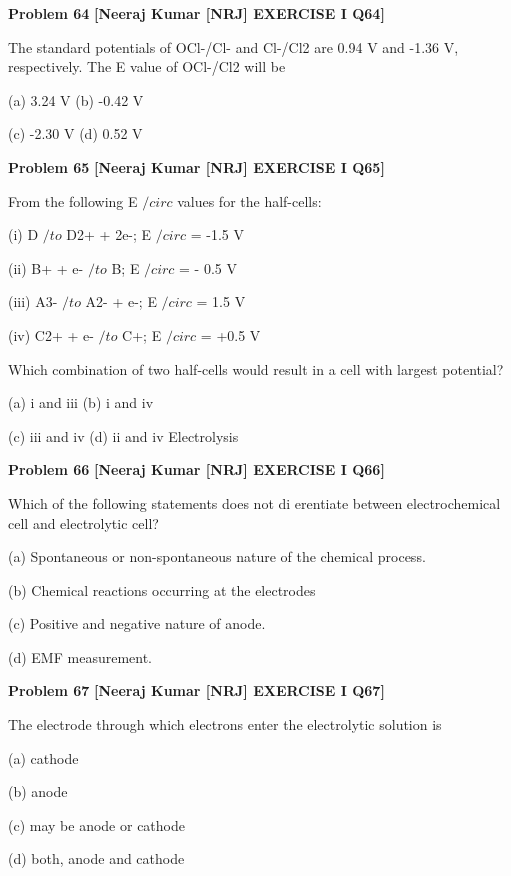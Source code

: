 \begin{problembox}
\textbf{Problem 64} \hfill \textbf{[Neeraj Kumar [NRJ] EXERCISE I Q64]}
\label{q:ext-nrj_all_questions-64}

The standard potentials of OCl-/Cl- and Cl-/Cl2 
are 0.94 V and -1.36 V, respectively. The E  value 
of OCl-/Cl2 will be
 
 (a) 3.24 V 
(b) -0.42 V
 
 (c) -2.30 V 
(d) 0.52 V
\end{problembox}

\begin{problembox}
\textbf{Problem 65} \hfill \textbf{[Neeraj Kumar [NRJ] EXERCISE I Q65]}
\label{q:ext-nrj_all_questions-65}

From the following E $/circ$ values for the half-cells:
 
   (i) D $/to$ D2+ + 2e-; E $/circ$ = -1.5 V
 
  (ii) B+ + e- $/to$ B; E $/circ$ = - 0.5 V
 
 (iii) A3- $/to$ A2- + e-; E $/circ$ = 1.5 V
 
 (iv) C2+ + e- $/to$ C+; E $/circ$ = +0.5 V
 
 Which combination of two half-cells would result 
in a cell with largest  potential?
 
 (a) i and iii 
(b) i and iv
 
 (c) iii and iv 
(d) ii and iv
Electrolysis
\end{problembox}

\begin{problembox}
\textbf{Problem 66} \hfill \textbf{[Neeraj Kumar [NRJ] EXERCISE I Q66]}
\label{q:ext-nrj_all_questions-66}

Which of the following statements does not 
di  erentiate between electrochemical cell and 
electrolytic cell?
 
 (a)  Spontaneous or non-spontaneous nature of 
the chemical process.
 
 (b)  Chemical reactions occurring at the electrodes
 
 (c) Positive and negative nature of anode.
 
 (d) EMF measurement.
\end{problembox}

\begin{problembox}
\textbf{Problem 67} \hfill \textbf{[Neeraj Kumar [NRJ] EXERCISE I Q67]}
\label{q:ext-nrj_all_questions-67}

The electrode through which electrons enter the 
electrolytic solution is
 
 (a) cathode
 
 (b) anode
 
 (c) may be anode or cathode
 
 (d) both, anode and cathode
\end{problembox}


